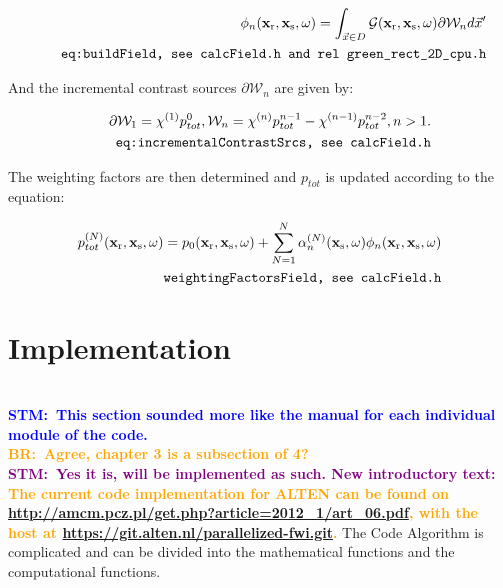\documentclass[10pt,a4paper]{article}
\newcommand{\commentstm}[1]{\textcolor{blue}{\textbf{STM:\ #1}}}
\newcommand{\commentstmtwo}[1]{\textcolor{purple}{\textbf{STM:\ #1}}}
\newcommand{\newstmtwo}[1]{\textcolor{orange}{\textbf{#1}}}
\newcommand{\oldstmtwo}[1]{\xout{#1}}
\newcommand{\commentbr}[1]{\textcolor{orange}{\textbf{BR:\ #1}}}
\begin{document}
\begin{align} \label{eq:buildField} \phi_n
(\mathbf{x_\text{r}},\mathbf{x_\text{s}},\omega) = \int_{\vec{x}\in D}
\mathcal{G} (\mathbf{x_\text{r}},\mathbf{x_\text{s}},\omega)\partial
\mathcal{W}_n d\vec{x}' \\
\tag*{\texttt{eq:buildField, see calcField.h and rel green\_rect\_2D\_cpu.h}}
\end{align}

And the incremental contrast sources $\partial \mathcal{W}_n$ are given by:

\begin{align} \label{eq:incrementalContrastSrcs} \partial \mathcal{W}_1 = \chi^{(1)}
p^{0}_{tot} , \mathcal{W}_n = \chi^{(n)} p^{n-1}_{tot} - \chi^{(n-1)}
p^{n-2}_{tot}, n > 1.\\
\tag*{\texttt{eq:incrementalContrastSrcs, see calcField.h}}
\end{align}

The weighting factors are then determined and $p_{tot}$ is updated
according to the equation:

\begin{align} \label{eq:weightingFactorsField} p^{(N)}_{tot}
(\mathbf{x_\text{r}},\mathbf{x_\text{s}},\omega) =  p_0
(\mathbf{x_\text{r}},\mathbf{x_\text{s}},\omega) + \sum\limits_{N=1}^N
\alpha^{(N)}_n (\mathbf{x_\text{s}},\omega) \phi_n
(\mathbf{x_\text{r}},\mathbf{x_\text{s}},\omega)\\
\tag*{\texttt{weightingFactorsField, see calcField.h}}
\end{align}



\section{Implementation}
\oldstmtwo{\textbf{4.Code Algorithm}}\\
\commentstm{This section sounded more like the manual for each
individual module of the code.}\\
\commentbr{Agree, chapter 3 is a subsection of 4?}\\
\commentstmtwo{Yes it is, will be implemented as such. New introductory text:}\\
\newstmtwo{The current code implementation for ALTEN can be found on
\url{http://amcm.pcz.pl/get.php?article=2012_1/art_06.pdf}, with the
host at \url{https://git.alten.nl/parallelized-fwi.git}.}
The Code Algorithm is complicated and can be divided into the
mathematical functions and the computational functions.
\end{document}
